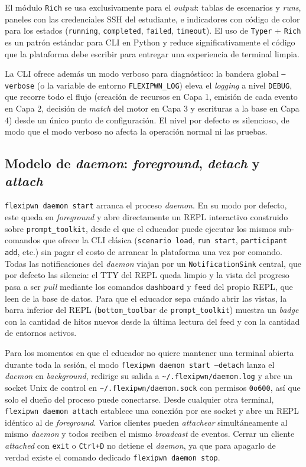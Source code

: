 El módulo \texttt{Rich} se usa exclusivamente para el \textit{output}: tablas de
escenarios y \textit{runs}, paneles con las credenciales SSH del estudiante, e
indicadores con código de color para los estados (\texttt{running},
\texttt{completed}, \texttt{failed}, \texttt{timeout}). El uso de \texttt{Typer}
+ \texttt{Rich} es un patrón estándar para CLI en Python y reduce
significativamente el código que la plataforma debe escribir para entregar una
experiencia de terminal limpia.

La CLI ofrece además un modo verboso para diagnóstico: la bandera global
\texttt{--verbose} (o la variable de entorno \texttt{FLEXIPWN\_LOG}) eleva el
\textit{logging} a nivel \texttt{DEBUG}, que recorre todo el flujo (creación de
recursos en Capa 1, emisión de cada evento en Capa 2, decisión de \textit{match}
del motor en Capa 3 y escrituras a la base en Capa 4) desde un único punto de
configuración. El nivel por defecto es silencioso, de modo que el modo verboso
no afecta la operación normal ni las pruebas.

\subsection{Modelo de \textit{daemon}: \textit{foreground}, \textit{detach} y \textit{attach}}

\texttt{flexipwn daemon start} arranca el proceso \textit{daemon}. En su modo
por defecto, este queda en \textit{foreground} y abre directamente un REPL
interactivo construido sobre \texttt{prompt\_toolkit}, desde el que el educador
puede ejecutar los mismos sub-comandos que ofrece la CLI clásica
(\texttt{scenario load}, \texttt{run start}, \texttt{participant add}, etc.) sin
pagar el costo de arrancar la plataforma una vez por comando. Todas las
notificaciones del \textit{daemon} viajan por un \texttt{NotificationSink}
central, que por defecto las silencia: el TTY del REPL queda limpio y la
vista del progreso pasa a ser \textit{pull} mediante los comandos
\texttt{dashboard} y \texttt{feed} del propio REPL, que leen de la base de
datos. Para que el educador sepa
cuándo abrir las vistas, la barra inferior del REPL (\texttt{bottom\_toolbar}
de \texttt{prompt\_toolkit}) muestra un \textit{badge} con la cantidad de
hitos nuevos desde la última lectura del feed y con la cantidad de entornos
activos.

Para los momentos en que el educador no quiere mantener una terminal abierta
durante toda la sesión, el modo \texttt{flexipwn daemon start --detach} lanza el
\textit{daemon} en \textit{background}, redirige su salida a
\texttt{\textasciitilde/.flexipwn/daemon.log} y abre un socket Unix de control
en \texttt{\textasciitilde/.flexipwn/daemon.sock} con permisos \texttt{0o600},
así que solo el dueño del proceso puede conectarse. Desde cualquier otra
terminal, \texttt{flexipwn daemon attach} establece una conexión por ese socket
y abre un REPL idéntico al de \textit{foreground}. Varios clientes pueden
\textit{attachear} simultáneamente al mismo \textit{daemon} y todos reciben el
mismo \textit{broadcast} de eventos. Cerrar un cliente \textit{attached} con
\texttt{exit} o \texttt{Ctrl+D} no detiene el \textit{daemon}, ya que para
apagarlo de verdad existe el comando dedicado \texttt{flexipwn daemon stop}.

